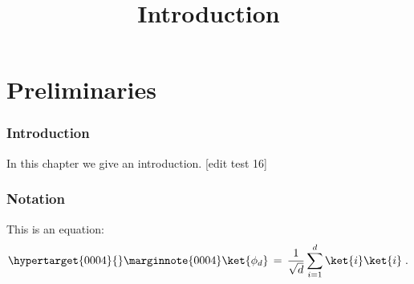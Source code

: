 

%
\usepackage{marginnote}


\title{Introduction}
\hypertarget{0000}{}
\reversemarginpar{}
\label{introduction}


\maketitle


\tableofcontents

\part{Preliminaries}
\hypertarget{0001}{}
\reversemarginpar{}
\label{book-part-preliminaries}

\hypertarget{0002}{}
\reversemarginpar{}
\section{Introduction}
\label{section:introduction}

In this chapter we give an introduction. [edit test 16]

\hypertarget{0003}{}
\reversemarginpar{}
\section{Notation}
\label{section-notation}

This is an equation:
\begin{equation}
\hypertarget{0004}{}
\reversemarginpar\marginnote{\textnormal{0004}}
\label{eq:me-state}
 \ket{\phi_d} \,=\,\frac{1}{\sqrt{d}} \sum_{i=1}^d \ket{i}\ket{i}\;.
\end{equation}









